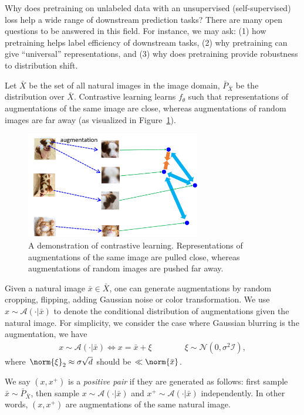 Why does pretraining on unlabeled data with an unsupervised (self-supervised) loss help a wide range of downstream prediction tasks? There are many open questions to be answered in this field. For instance,  we may ask: (1) how pretraining helps label efficiency of downstream tasks, (2) why pretraining can give ``universal'' representations, and (3) why does pretraining provide robustness to distribution shift. 

\label{section:analysis_contrastive_learning}
Let $\bar{X}$ be the set of all natural images in the image domain, $\bar{P}_{\bar{X}}$ be the distribution over $\bar{X}$. Contrastive learning learns $f_{\theta}$ such that representations of augmentations of the same image are close, whereas augmentations of random images are far away (as visualized in Figure~\ref{fig:ssl2}). 

\begin{figure}[ht]
	\centering
	\includegraphics[width=3in]{figures/ssl5.pdf}
	\caption{A demonstration of contrastive learning. Representations of augmentations of the same image are pulled close, whereas augmentations of random images are pushed far away.}
	\label{fig:ssl2}
\end{figure}

\newcommand{\aug}[1]{\mathcal{A}(\cdot|#1)}

Given a natural image $\bar{x}\in\bar{X}$, one can generate augmentations by random cropping, flipping, adding Gaussian noise or color transformation. We use $x\sim\aug{\bar{x}}$ to denote the conditional distribution of augmentations given the natural image. For simplicity, we consider the case where Gaussian blurring is the augmentation, we have
\begin{align}
	x\sim\aug{\bar{x}} \Leftrightarrow x=\bar{x}+\xi \quad\quad\quad\quad \xi\sim\mathcal{N}(0, \sigma^2\mathcal{I}),
\end{align}
where $\norm{\xi}_2\approx\sigma\sqrt{d}$ should be $\ll\norm{\bar{x}}$. 

We say $(x, x^+)$ is a \emph{positive pair} if they are generated as follows: first sample $\bar{x}\sim \bar{P}_{\bar{X}}$, then sample $x\sim\aug{\bar{x}}$ and $x^+\sim\aug{\bar{x}}$ independently. In other words, $(x, x^+)$ are augmentations of the same natural image.


